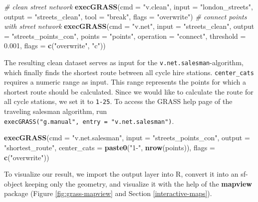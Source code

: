 \documentclass[]{krantz}
\newenvironment{Shaded}{\begin{snugshade}}{\end{snugshade}}
\newcommand{\CommentTok}[1]{\textcolor[rgb]{0.37,0.37,0.37}{\textit{#1}}}
\newcommand{\DataTypeTok}[1]{\textcolor[rgb]{0.27,0.27,0.27}{#1}}
\newcommand{\FloatTok}[1]{\textcolor[rgb]{0.06,0.06,0.06}{#1}}
\newcommand{\KeywordTok}[1]{\textcolor[rgb]{0.27,0.27,0.27}{\textbf{#1}}}
\newcommand{\NormalTok}[1]{#1}
\newcommand{\StringTok}[1]{\textcolor[rgb]{0.5,0.5,0.5}{#1}}
\begin{document}
\begin{Shaded}
\begin{Highlighting}[]
\CommentTok{# clean street network}
\KeywordTok{execGRASS}\NormalTok{(}\DataTypeTok{cmd =} \StringTok{"v.clean"}\NormalTok{, }\DataTypeTok{input =} \StringTok{"london_streets"}\NormalTok{, }\DataTypeTok{output =} \StringTok{"streets_clean"}\NormalTok{,}
          \DataTypeTok{tool =} \StringTok{"break"}\NormalTok{, }\DataTypeTok{flags =} \StringTok{"overwrite"}\NormalTok{)}
\CommentTok{# connect points with street network}
\KeywordTok{execGRASS}\NormalTok{(}\DataTypeTok{cmd =} \StringTok{"v.net"}\NormalTok{, }\DataTypeTok{input =} \StringTok{"streets_clean"}\NormalTok{, }\DataTypeTok{output =} \StringTok{"streets_points_con"}\NormalTok{, }
          \DataTypeTok{points =} \StringTok{"points"}\NormalTok{, }\DataTypeTok{operation =} \StringTok{"connect"}\NormalTok{, }\DataTypeTok{threshold =} \FloatTok{0.001}\NormalTok{,}
          \DataTypeTok{flags =} \KeywordTok{c}\NormalTok{(}\StringTok{"overwrite"}\NormalTok{, }\StringTok{"c"}\NormalTok{))}
\end{Highlighting}
\end{Shaded}

The resulting clean dataset serves as input for the \texttt{v.net.salesman}-algorithm, which finally finds the shortest route between all cycle hire stations.
\texttt{center\_cats} requires a numeric range as input.
This range represents the points for which a shortest route should be calculated.
Since we would like to calculate the route for all cycle stations, we set it to \texttt{1-25}.
To access the GRASS help page of the traveling salesman algorithm, run \texttt{execGRASS("g.manual",\ entry\ =\ "v.net.salesman")}.

\begin{Shaded}
\begin{Highlighting}[]
\KeywordTok{execGRASS}\NormalTok{(}\DataTypeTok{cmd =} \StringTok{"v.net.salesman"}\NormalTok{, }\DataTypeTok{input =} \StringTok{"streets_points_con"}\NormalTok{,}
          \DataTypeTok{output =} \StringTok{"shortest_route"}\NormalTok{, }\DataTypeTok{center_cats =} \KeywordTok{paste0}\NormalTok{(}\StringTok{"1-"}\NormalTok{, }\KeywordTok{nrow}\NormalTok{(points)),}
          \DataTypeTok{flags =} \KeywordTok{c}\NormalTok{(}\StringTok{"overwrite"}\NormalTok{))}
\end{Highlighting}
\end{Shaded}

To visualize our result, we import the output layer into R, convert it into an sf-object keeping only the geometry, and visualize it with the help of the \textbf{mapview} package (Figure \ref{fig:grass-mapview} and Section \ref{interactive-maps}).
\end{document}
